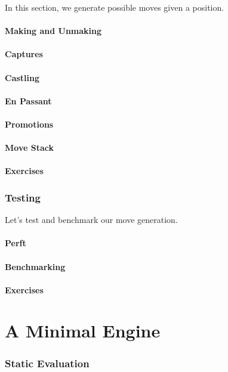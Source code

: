 \documentclass[letterpaper,11pt]{article}
\begin{document}
In this section, we generate possible moves given a position.

\subsection{Making and Unmaking}
\subsection{Captures}
\subsection{Castling}
\subsection{En Passant}
\subsection{Promotions}
\subsection{Move Stack}
\subsection{Exercises}

\section{Testing}

Let's test and benchmark our move generation.

\subsection{Perft}
\subsection{Benchmarking}
\subsection{Exercises}

\part{A Minimal Engine}

\section{Static Evaluation}
\end{document}
